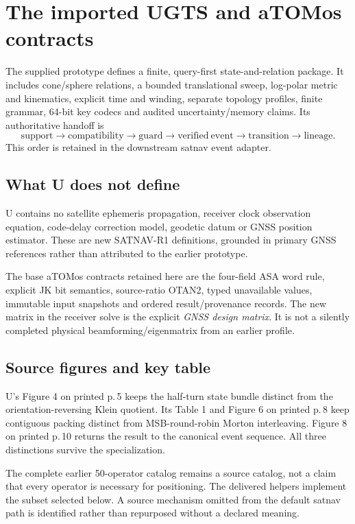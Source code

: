 



\section{The imported UGTS and aTOMos contracts}
The supplied prototype defines a finite, query-first state-and-relation package. It
includes cone/sphere relations, a bounded translational sweep, log-polar metric and
kinematics, explicit time and winding, separate topology profiles, finite grammar,
64-bit key codecs and audited uncertainty/memory claims. Its authoritative handoff is
\begin{equation}
\mathrm{support}\to\mathrm{compatibility}\to\mathrm{guard}\to\mathrm{verified\ event}
\to\mathrm{transition}\to\mathrm{lineage}.
\end{equation}
This order is retained in the downstream satnav event adapter. 

\subsection{What U does not define}
U contains no satellite ephemeris propagation, receiver clock observation equation,
code-delay correction model, geodetic datum or GNSS position estimator. These are
new SATNAV-R1 definitions, grounded in primary GNSS references rather than attributed
to the earlier prototype. 

The base aTOMos contracts retained here are the four-field ASA word rule, explicit JK
bit semantics, source-ratio OTAN2, typed unavailable values, immutable input snapshots
and ordered result/provenance records. The new matrix in the receiver solve is the
explicit \emph{GNSS design matrix}. It is not a silently completed physical
beamforming/eigenmatrix from an earlier profile. \base

\subsection{Source figures and key table}
U's Figure 4 on printed p.\,5 keeps the half-turn state bundle distinct from the
orientation-reversing Klein quotient. Its Table 1 and Figure 6 on printed p.\,8 keep
contiguous packing distinct from MSB-round-robin Morton interleaving. Figure 8 on
printed p.\,10 returns the result to the canonical event sequence. All three distinctions
survive the specialization.

The complete earlier 50-operator catalog remains a source catalog, not a claim that
every operator is necessary for positioning. The delivered helpers implement the
subset selected below. A source mechanism omitted from the default satnav path is
identified rather than repurposed without a declared meaning.
\clearpage

